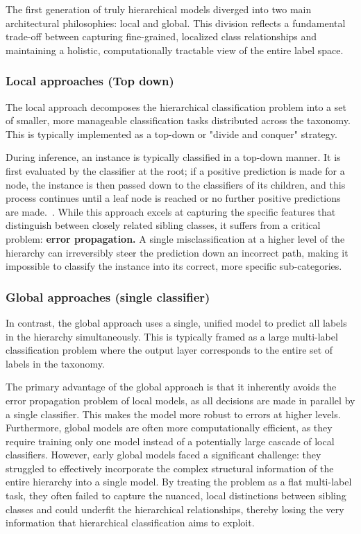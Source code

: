 The first generation of truly hierarchical models diverged into two main architectural philosophies: local and global. This division reflects a fundamental trade-off between capturing fine-grained, localized class relationships and maintaining a holistic, computationally tractable view of the entire label space.

\subsubsection{Local approaches (Top down)}
The local approach decomposes the hierarchical classification problem into a set of smaller, more manageable classification tasks distributed across the taxonomy. This is typically implemented as a top-down or "divide and conquer" strategy.

During inference, an instance is typically classified in a top-down manner. It is first evaluated by the classifier at the root; if a positive prediction is made for a node, the instance is then passed down to the classifiers of its children, and this process continues until a leaf node is reached or no further positive predictions are made.~\cite{Romero2022}. While this approach excels at capturing the specific features that distinguish between closely related sibling classes, it suffers from a critical problem: \textbf{error propagation.} A single misclassification at a higher level of the hierarchy can irreversibly steer the prediction down an incorrect path, making it impossible to classify the instance into its correct, more specific sub-categories.~\cite{Wehrmann2018}

\subsubsection{Global approaches (single classifier)}
In contrast, the global approach uses a single, unified model to predict all labels in the hierarchy simultaneously. This is typically framed as a large multi-label classification problem where the output layer corresponds to the entire set of labels in the taxonomy.~\cite{Wehrmann2018}

The primary advantage of the global approach is that it inherently avoids the error propagation problem of local models, as all decisions are made in parallel by a single classifier. This makes the model more robust to errors at higher levels. Furthermore, global models are often more computationally efficient, as they require training only one model instead of a potentially large cascade of local classifiers. However, early global models faced a significant challenge: they struggled to effectively incorporate the complex structural information of the entire hierarchy into a single model. By treating the problem as a flat multi-label task, they often failed to capture the nuanced, local distinctions between sibling classes and could underfit the hierarchical relationships, thereby losing the very information that hierarchical classification aims to exploit.~\cite{Wehrmann2018, zhou-etal-2020-hierarchy}

